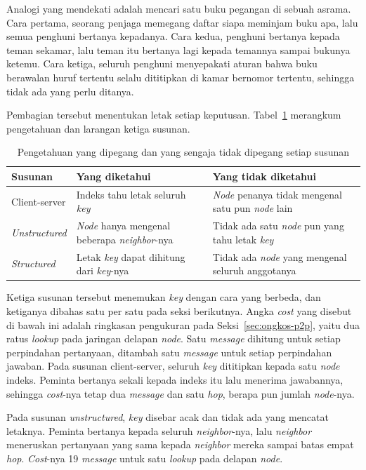Analogi yang mendekati adalah mencari satu buku pegangan di sebuah asrama. Cara
pertama, seorang penjaga memegang daftar siapa meminjam buku apa, lalu semua
penghuni bertanya kepadanya. Cara kedua, penghuni bertanya kepada teman
sekamar, lalu teman itu bertanya lagi kepada temannya sampai bukunya ketemu.
Cara ketiga, seluruh penghuni menyepakati aturan bahwa buku berawalan huruf
tertentu selalu dititipkan di kamar bernomor tertentu, sehingga tidak ada yang
perlu ditanya.

Pembagian tersebut menentukan letak setiap keputusan.
Tabel~\ref{tab:tanggung-p2p} merangkum pengetahuan dan larangan ketiga susunan.

\begin{table}[htbp]
  \centering
  \caption{Pengetahuan yang dipegang dan yang sengaja tidak dipegang setiap
    susunan}
  \label{tab:tanggung-p2p}
  \begin{tabularx}{\textwidth}{|l|X|X|}
    \hline
    \textbf{Susunan} & \textbf{Yang diketahui} & \textbf{Yang tidak diketahui} \\
    \hline
    Client-server & Indeks tahu letak seluruh \textit{key} & \textit{Node} penanya tidak mengenal satu pun \textit{node} lain \\
    \hline
    \textit{Unstructured} & \textit{Node} hanya mengenal beberapa \textit{neighbor}-nya & Tidak ada satu \textit{node} pun yang tahu letak \textit{key} \\
    \hline
    \textit{Structured} & Letak \textit{key} dapat dihitung dari \textit{key}-nya & Tidak ada \textit{node} yang mengenal seluruh anggotanya \\
    \hline
  \end{tabularx}
\end{table}

Ketiga susunan tersebut menemukan \textit{key} dengan cara yang berbeda, dan ketiganya
dibahas satu per satu pada seksi berikutnya. Angka \textit{cost} yang disebut di bawah
ini adalah ringkasan pengukuran pada Seksi~\ref{sec:ongkos-p2p}, yaitu dua
ratus \textit{lookup} pada jaringan delapan \textit{node}. Satu \textit{message} dihitung
untuk setiap perpindahan pertanyaan, ditambah satu \textit{message} untuk setiap
perpindahan jawaban. Pada susunan client-server, seluruh
\textit{key} dititipkan kepada satu \textit{node} indeks. Peminta bertanya sekali
kepada indeks itu lalu menerima jawabannya, sehingga \textit{cost}-nya tetap dua \textit{message}
dan satu \textit{hop}, berapa pun jumlah \textit{node}-nya.

Pada susunan \textit{unstructured}, \textit{key} disebar acak dan tidak ada yang
mencatat letaknya. Peminta bertanya kepada seluruh \textit{neighbor}-nya, lalu
\textit{neighbor} meneruskan pertanyaan yang sama kepada \textit{neighbor}
mereka sampai batas empat \textit{hop}. \textit{Cost}-nya 19 \textit{message} untuk satu
\textit{lookup} pada delapan \textit{node}.

